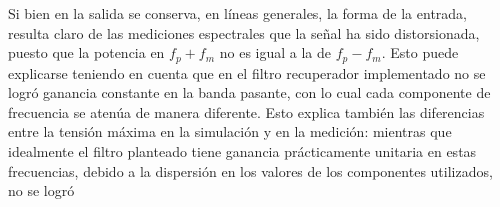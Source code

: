 \documentclass[a4paper]{article}
\begin{document}
Si bien en la salida se conserva, en l\'ineas generales, la forma de la entrada, resulta claro de las mediciones espectrales que la se\~nal ha sido distorsionada, puesto que la potencia en $f_p+f_m$ no es igual a la de $f_p-f_m$. Esto puede explicarse teniendo en cuenta que en el filtro recuperador implementado no se logr\'o ganancia constante en la banda pasante, con lo cual cada componente de frecuencia se aten\'ua de manera diferente. Esto explica tambi\'en las diferencias entre la tensi\'on m\'axima en la simulaci\'on y en la medici\'on: mientras que idealmente el filtro planteado tiene ganancia pr\'acticamente unitaria en estas frecuencias, debido a la dispersi\'on en los valores de los componentes utilizados, no se logr\'o 
\end{document}
